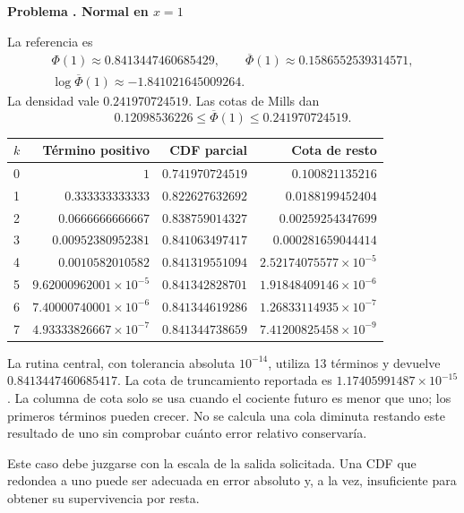 \documentclass[11pt,a4paper]{article}
\theoremstyle{definition}
\newcommand{\Q}{\overline\Phi}
\newcounter{problema}
\newenvironment{resuelto}[1]{\refstepcounter{problema}\par\medskip\Needspace{6\baselineskip}\textbf{Problema \theproblema. #1}\par}{\par\medskip}
\begin{document}
\begin{resuelto}{Normal en $x=1$}
La referencia es
\[
\begin{gathered}
\Phi(1)\approx0.8413447460685429,\qquad \Q(1)\approx0.1586552539314571,\\
\log\Q(1)\approx-1.841021645009264.
\end{gathered}
\]
La densidad vale $0.241970724519$. Las cotas de Mills dan
\[
0.12098536226\le\Q(1)\le0.241970724519.
\]

\begin{center}\small\begin{tabular}{lrrr}
\toprule
$k$ & Término positivo & CDF parcial & Cota de resto\\\midrule
0 & $1$ & $0.741970724519$ & $0.100821135216$\\
1 & $0.333333333333$ & $0.822627632692$ & $0.0188199452404$\\
2 & $0.0666666666667$ & $0.838759014327$ & $0.00259254347699$\\
3 & $0.00952380952381$ & $0.841063497417$ & $0.000281659044414$\\
4 & $0.0010582010582$ & $0.841319551094$ & $2.52174075577\times10^{-5}$\\
5 & $9.62000962001\times10^{-5}$ & $0.841342828701$ & $1.91848409146\times10^{-6}$\\
6 & $7.40000740001\times10^{-6}$ & $0.841344619286$ & $1.26833114935\times10^{-7}$\\
7 & $4.93333826667\times10^{-7}$ & $0.841344738659$ & $7.41200825458\times10^{-9}$\\
\bottomrule\end{tabular}\end{center}

La rutina central, con tolerancia absoluta $10^{-14}$, utiliza 13 términos y devuelve $0.8413447460685417$. La cota de truncamiento reportada es $1.17405991487\times10^{-15}$. La columna de cota solo se usa cuando el cociente futuro es menor que uno; los primeros términos pueden crecer.
No se calcula una cola diminuta restando este resultado de uno sin comprobar cuánto error relativo conservaría.

Este caso debe juzgarse con la escala de la salida solicitada. Una CDF que redondea a uno puede ser adecuada en error absoluto y, a la vez, insuficiente para obtener su supervivencia por resta.
\end{resuelto}
\end{document}
